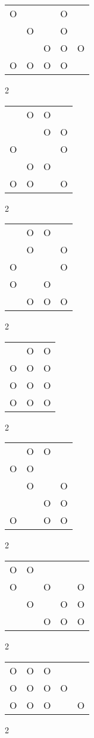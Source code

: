 \begin{tabular}{|m{0.2cm}m{0.2cm}m{0.2cm}m{0.2cm}m{0.2cm}|}\hline
O& & &O& \\
 &O& &O& \\
 & &O&O&O\\
O&O&O&O& \\
\hline\end{tabular}2
\begin{tabular}{|m{0.2cm}m{0.2cm}m{0.2cm}m{0.2cm}|}\hline
 &O&O& \\
 & &O&O\\
O& & &O\\
 &O&O& \\
O&O& &O\\
\hline\end{tabular}2
\begin{tabular}{|m{0.2cm}m{0.2cm}m{0.2cm}m{0.2cm}|}\hline
 &O&O& \\
 &O& &O\\
O& & &O\\
O& &O& \\
 &O&O&O\\
\hline\end{tabular}2
\begin{tabular}{|m{0.2cm}m{0.2cm}m{0.2cm}|}\hline
 &O&O\\
O&O&O\\
O&O&O\\
O&O&O\\
\hline\end{tabular}2
\begin{tabular}{|m{0.2cm}m{0.2cm}m{0.2cm}m{0.2cm}|}\hline
 &O&O& \\
O&O& & \\
 &O& &O\\
 & &O&O\\
O& &O&O\\
\hline\end{tabular}2
\begin{tabular}{|m{0.2cm}m{0.2cm}m{0.2cm}m{0.2cm}m{0.2cm}|}\hline
O&O& & & \\
O& &O& &O\\
 &O& &O&O\\
 & &O&O&O\\
\hline\end{tabular}2
\begin{tabular}{|m{0.2cm}m{0.2cm}m{0.2cm}m{0.2cm}m{0.2cm}|}\hline
O&O&O& & \\
O&O&O&O& \\
O&O&O& &O\\
\hline\end{tabular}2
